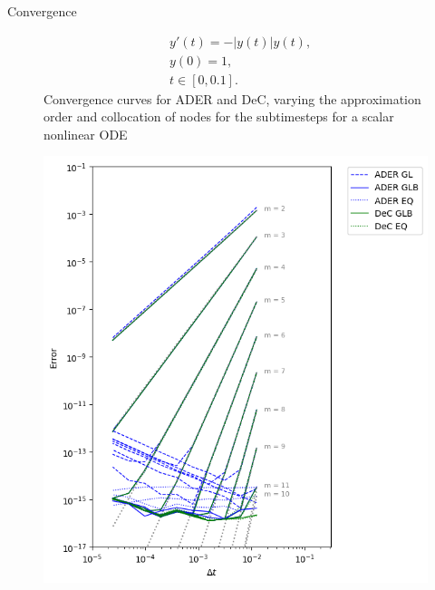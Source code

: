 \documentclass[9pt,compress,t,aspectratio=169]{beamer}
\begin{document}
\begin{frame}{Convergence}

\begin{figure}
\begin{minipage}[c]{0.55\linewidth}
\begin{equation}
\label{eq:scalar-nonlinear}
\begin{split}
&y'(t) = - |y(t)| y(t) ,\\
&y(0) = 1,\\
&t\in [0,0.1].
\end{split}
\end{equation}
Convergence curves for ADER and DeC, varying the approximation order and collocation of nodes for the subtimesteps for a scalar nonlinear ODE 
\end{minipage}
\hfill
\begin{minipage}[c]{0.4\linewidth}
\includegraphics[width=\linewidth]{scalar-2.png}
\end{minipage}%
\end{figure}


\end{frame}
\end{document}
